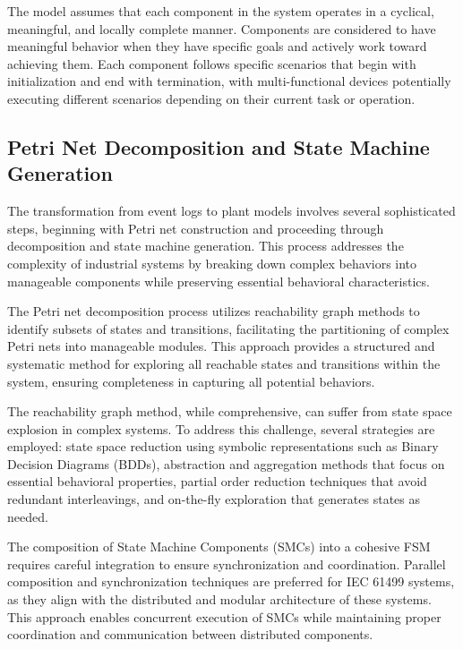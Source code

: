 The model assumes that each component in the system operates in a cyclical, meaningful, and locally complete manner. Components are considered to have meaningful behavior when they have specific goals and actively work toward achieving them. Each component follows specific scenarios that begin with initialization and end with termination, with multi-functional devices potentially executing different scenarios depending on their current task or operation.

\subsection{Petri Net Decomposition and State Machine Generation}

The transformation from event logs to plant models involves several sophisticated steps, beginning with Petri net construction and proceeding through decomposition and state machine generation. This process addresses the complexity of industrial systems by breaking down complex behaviors into manageable components while preserving essential behavioral characteristics.

The Petri net decomposition process utilizes reachability graph methods to identify subsets of states and transitions, facilitating the partitioning of complex Petri nets into manageable modules. This approach provides a structured and systematic method for exploring all reachable states and transitions within the system, ensuring completeness in capturing all potential behaviors.



The reachability graph method, while comprehensive, can suffer from state space explosion in complex systems. To address this challenge, several strategies are employed: state space reduction using symbolic representations such as Binary Decision Diagrams (BDDs), abstraction and aggregation methods that focus on essential behavioral properties, partial order reduction techniques that avoid redundant interleavings, and on-the-fly exploration that generates states as needed.

The composition of State Machine Components (SMCs) into a cohesive FSM requires careful integration to ensure synchronization and coordination. Parallel composition and synchronization techniques are preferred for IEC 61499 systems, as they align with the distributed and modular architecture of these systems. This approach enables concurrent execution of SMCs while maintaining proper coordination and communication between distributed components.

